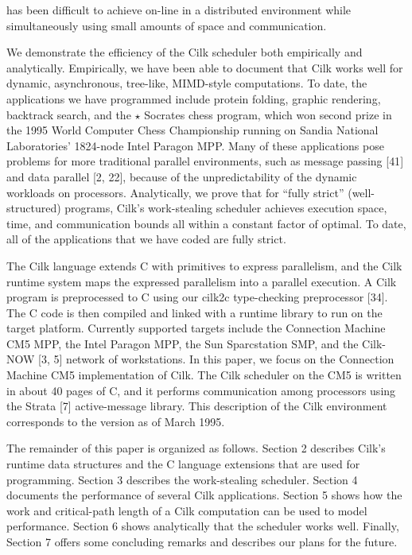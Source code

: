 \documentclass[
]{article}
\begin{document}
has been difficult to achieve on-line in a distributed environment while
simultaneously using small amounts of space and communication.

We demonstrate the efficiency of the Cilk scheduler both empirically and
analytically. Empirically, we have been able to document that Cilk works
well for dynamic, asynchronous, tree-like, MIMD-style computations. To
date, the applications we have programmed include protein folding,
graphic rendering, backtrack search, and the \(\star\) Socrates chess
program, which won second prize in the 1995 World Computer Chess
Championship running on Sandia National Laboratories' 1824-node Intel
Paragon MPP. Many of these applications pose problems for more
traditional parallel environments, such as message passing {[}41{]} and
data parallel {[}2, 22{]}, because of the unpredictability of the
dynamic workloads on processors. Analytically, we prove that for ``fully
strict'' (well-structured) programs, Cilk's work-stealing scheduler
achieves execution space, time, and communication bounds all within a
constant factor of optimal. To date, all of the applications that we
have coded are fully strict.

The Cilk language extends C with primitives to express parallelism, and
the Cilk runtime system maps the expressed parallelism into a parallel
execution. A Cilk program is preprocessed to C using our cilk2c
type-checking preprocessor {[}34{]}. The C code is then compiled and
linked with a runtime library to run on the target platform. Currently
supported targets include the Connection Machine CM5 MPP, the Intel
Paragon MPP, the Sun Sparcstation SMP, and the Cilk-NOW {[}3, 5{]}
network of workstations. In this paper, we focus on the Connection
Machine CM5 implementation of Cilk. The Cilk scheduler on the CM5 is
written in about 40 pages of C, and it performs communication among
processors using the Strata {[}7{]} active-message library. This
description of the Cilk environment corresponds to the version as of
March 1995.

The remainder of this paper is organized as follows. Section 2 describes
Cilk's runtime data structures and the C language extensions that are
used for programming. Section 3 describes the work-stealing scheduler.
Section 4 documents the performance of several Cilk applications.
Section 5 shows how the work and critical-path length of a Cilk
computation can be used to model performance. Section 6 shows
analytically that the scheduler works well. Finally, Section 7 offers
some concluding remarks and describes our plans for the future.
\end{document}
